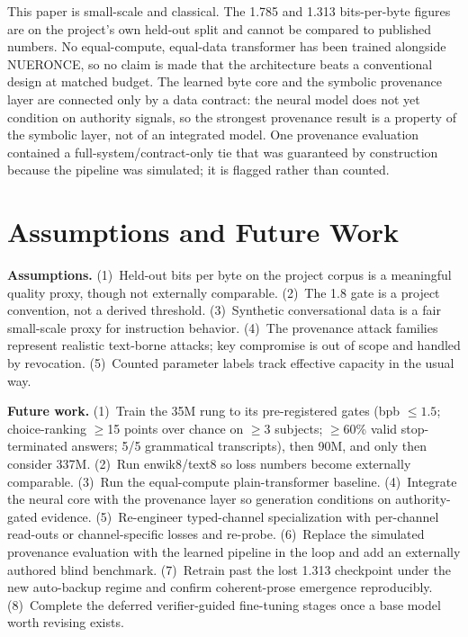 \documentclass[journal]{IEEEtran}
\begin{document}
This paper is small-scale and classical. The 1.785 and 1.313 bits-per-byte figures are on the project's own held-out split and cannot be compared to published numbers. No equal-compute, equal-data transformer has been trained alongside NUERONCE, so no claim is made that the architecture beats a conventional design at matched budget. The learned byte core and the symbolic provenance layer are connected only by a data contract: the neural model does not yet condition on authority signals, so the strongest provenance result is a property of the symbolic layer, not of an integrated model. One provenance evaluation contained a full-system/contract-only tie that was guaranteed by construction because the pipeline was simulated; it is flagged rather than counted.

\section{Assumptions and Future Work}

\textbf{Assumptions.} (1)~Held-out bits per byte on the project corpus is a meaningful quality proxy, though not externally comparable. (2)~The 1.8 gate is a project convention, not a derived threshold. (3)~Synthetic conversational data is a fair small-scale proxy for instruction behavior. (4)~The provenance attack families represent realistic text-borne attacks; key compromise is out of scope and handled by revocation. (5)~Counted parameter labels track effective capacity in the usual way.

\textbf{Future work.} (1)~Train the 35M rung to its pre-registered gates (bpb $\le 1.5$; choice-ranking $\ge$15 points over chance on $\ge$3 subjects; $\ge$60\% valid stop-terminated answers; 5/5 grammatical transcripts), then 90M, and only then consider 337M. (2)~Run enwik8/text8 so loss numbers become externally comparable. (3)~Run the equal-compute plain-transformer baseline. (4)~Integrate the neural core with the provenance layer so generation conditions on authority-gated evidence. (5)~Re-engineer typed-channel specialization with per-channel read-outs or channel-specific losses and re-probe. (6)~Replace the simulated provenance evaluation with the learned pipeline in the loop and add an externally authored blind benchmark. (7)~Retrain past the lost 1.313 checkpoint under the new auto-backup regime and confirm coherent-prose emergence reproducibly. (8)~Complete the deferred verifier-guided fine-tuning stages once a base model worth revising exists.
\end{document}
